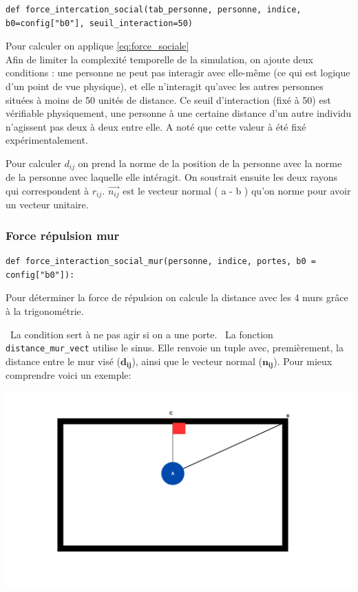 \documentclass[a4paper,12pt]{article}
\begin{document}
\begin{verbatim}
def force_intercation_social(tab_personne, personne, indice, b0=config["b0"], seuil_interaction=50)
\end{verbatim}

Pour calculer on applique \eqref{eq:force_sociale}
\\

Afin de limiter la complexité temporelle de la simulation, on ajoute deux conditions : une personne ne peut pas interagir avec elle-même (ce qui est logique d’un point de vue physique), et elle n’interagit qu’avec les autres personnes situées à moins de 50 unités de distance.  Ce seuil d’interaction (fixé à 50) est vérifiable physiquement, une personne à une certaine distance d'un autre individu n'agissent pas deux à deux entre elle. A noté que cette valeur à été fixé expérimentalement.


Pour calculer $d_{ij}$ on prend la norme de la position de la personne avec la norme de la personne avec laquelle elle intéragit. On soustrait ensuite les deux rayons qui correspondent à $r_{ij}$. $\vec{n_{ij}}$ est le vecteur normal ( a - b ) qu'on norme pour avoir un vecteur unitaire. 


\subsubsection{Force répulsion mur}

\begin{verbatim}
def force_interaction_social_mur(personne, indice, portes, b0 = config["b0"]):
\end{verbatim}

Pour déterminer la force de répulsion on calcule la distance avec les 4 murs grâce à la trigonométrie. 

\
La condition sert à ne pas agir si on a une porte.
\
La fonction \texttt{distance\_mur\_vect} utilise le sinus. Elle renvoie un tuple avec, premièrement, la distance entre le mur visé ($\mathbf{d_{ij}}$), ainsi que le vecteur normal ($\mathbf{n_{ij}}$). Pour mieux comprendre voici un exemple:

\includegraphics[width=\textwidth]{explication.png}
\end{document}

